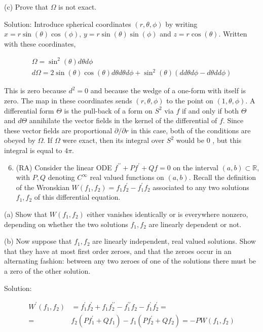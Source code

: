 \documentclass[10pt]{article}
\begin{document}
(c) Prove that $\Omega$ is not exact.

Solution: Introduce spherical coordinates $(r, \theta, \phi)$ by writing $x=r \sin (\theta) \cos (\phi)$, $y=r \sin (\theta) \sin (\phi)$ and $z=r \cos (\theta)$. Written with these coordinates,

$$
\begin{gathered}
\Omega=\sin ^{2}(\theta) d \theta d \phi \\
d \Omega=2 \sin (\theta) \cos (\theta) d \theta d \theta d \phi+\sin ^{2}(\theta)(d d \theta d \phi-d \theta d d \phi)
\end{gathered}
$$

This is zero because $d^{2}=0$ and because the wedge of a one-form with itself is zero. The map in these coordinates sends $(r, \theta, \phi)$ to the point on $(1, \theta, \phi)$. A differential form $\Theta$ is the pull-back of a form on $S^{2}$ via $f$ if and only if both $\Theta$ and $d \Theta$ annihilate the vector fields in the kernel of the differential of $f$. Since these vector fields are proportional $\partial / \partial r$ in this case, both of the conditions are obeyed by $\Omega$. If $\Omega$ were exact, then its integral over $S^{2}$ would be 0 , but this integral is equal to $4 \pi$.

\begin{enumerate}
  \setcounter{enumi}{5}
  \item (RA) Consider the linear ODE $f^{\prime \prime}+P f^{\prime}+Q f=0$ on the interval $(a, b) \subset \mathbb{R}$, with $P, Q$ denoting $C^{\infty}$ real valued functions on $(a, b)$. Recall the definition of the Wronskian $W\left(f_{1}, f_{2}\right)=f_{1} f_{2}^{\prime}-f_{1}^{\prime} f_{2}$ associated to any two solutions $f_{1}, f_{2}$ of this differential equation.
\end{enumerate}

(a) Show that $W\left(f_{1}, f_{2}\right)$ either vanishes identically or is everywhere nonzero, depending on whether the two solutions $f_{1}, f_{2}$ are linearly dependent or not.

(b) Now suppose that $f_{1}, f_{2}$ are linearly independent, real valued solutions. Show that they have at most first order zeroes, and that the zeroes occur in an alternating fashion: between any two zeroes of one of the solutions there must be a zero of the other solution.

Solution:

$$
\begin{aligned}
W^{\prime}\left(f_{1}, f_{2}\right) & =f_{1}^{\prime} f_{2}^{\prime}+f_{1} f_{2}^{\prime \prime}-f_{1}^{\prime \prime} f_{2}-f_{1}^{\prime} f_{2}^{\prime}= \\
= & f_{2}\left(P f_{1}^{\prime}+Q f_{1}\right)-f_{1}\left(P f_{2}^{\prime}+Q f_{2}\right)=-P W\left(f_{1}, f_{2}\right)
\end{aligned}
$$
\end{document}
